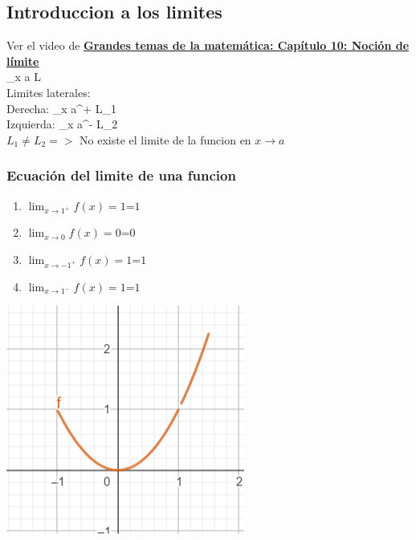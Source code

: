 \documentclass[stu, 12pt, letterpaper, donotrepeattitle, floatsintext, natbib]{apa7}
\begin{document}
    \subsection{Introduccion a los limites}\label{subsec:introduccion-a-los-limites}
    Ver el video de \href{https://youtu.be/eCB_Jr_VKyg?si=yKF3rE8HdfUNQ4gu}{\textbf{\color{blue}Grandes temas de la matemática: Capítulo 10: Noción de límite}}\\[0.5cm]

    \displaystyle\lim_{{x \to a}} L\\[0.5cm]
    Limites laterales:\\[0.5cm]
    Derecha: \displaystyle\lim_{{x \to a}^+} L_1\\
    Izquierda: \displaystyle\lim_{{x \to a}^-} L_2\\[0.5cm]

    $L_1 \neq L_2 =>$     No existe el limite de la funcion en $x \to a$\\[0.5cm]

    \subsubsection{Ecuación del limite de una funcion}
    \begin{paracol}{2}
        \begin{enumerate}
            \item $\displaystyle\lim_{{x \to 1^+}} f(x)=1 \textbf{=} 1$
            \item $\displaystyle\lim_{{x \to 0}} f(x)=0 \textbf{=} 0$
            \item $\displaystyle\lim_{{x \to -1^+}} f(x)=1 \textbf{=} 1$
            \item $\displaystyle\lim_{{x \to 1^-}} f(x)=1 \textbf{=} 1$
        \end{enumerate}
        \switchcolumn
        \includegraphics[scale=1]{lim}
    \end{paracol}
\end{document}
